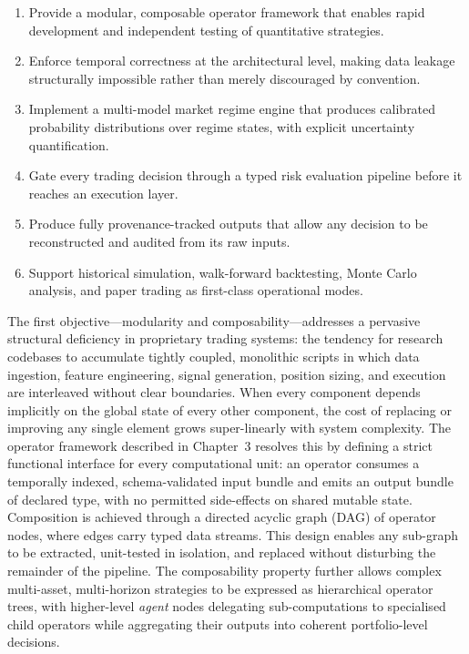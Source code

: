\documentclass[12pt,openany]{book}
\numberwithin{equation}{chapter}
\theoremstyle{plain}
\theoremstyle{definition}
\theoremstyle{remark}
\begin{document}
\begin{enumerate}
    \item Provide a modular, composable operator framework that enables rapid
          development and independent testing of quantitative strategies.
    \item Enforce temporal correctness at the architectural level, making
          data leakage structurally impossible rather than merely discouraged
          by convention.
    \item Implement a multi-model market regime engine that produces calibrated
          probability distributions over regime states, with explicit uncertainty
          quantification.
    \item Gate every trading decision through a typed risk evaluation pipeline
          before it reaches an execution layer.
    \item Produce fully provenance-tracked outputs that allow any decision to
          be reconstructed and audited from its raw inputs.
    \item Support historical simulation, walk-forward backtesting, Monte Carlo
          analysis, and paper trading as first-class operational modes.
\end{enumerate}

The first objective—modularity and composability—addresses a pervasive structural deficiency in proprietary trading systems: the tendency for research codebases to accumulate tightly coupled, monolithic scripts in which data ingestion, feature engineering, signal generation, position sizing, and execution are interleaved without clear boundaries. When every component depends implicitly on the global state of every other component, the cost of replacing or improving any single element grows super-linearly with system complexity. The operator framework described in Chapter~3 resolves this by defining a strict functional interface for every computational unit: an operator consumes a temporally indexed, schema-validated input bundle and emits an output bundle of declared type, with no permitted side-effects on shared mutable state. Composition is achieved through a directed acyclic graph (DAG) of operator nodes, where edges carry typed data streams. This design enables any sub-graph to be extracted, unit-tested in isolation, and replaced without disturbing the remainder of the pipeline. The composability property further allows complex multi-asset, multi-horizon strategies to be expressed as hierarchical operator trees, with higher-level \emph{agent} nodes delegating sub-computations to specialised child operators while aggregating their outputs into coherent portfolio-level decisions.
\end{document}
